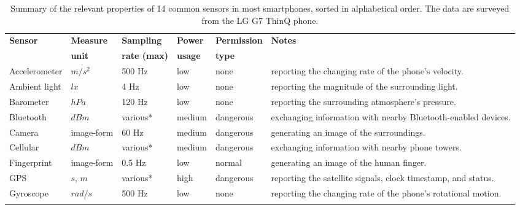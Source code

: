 \documentclass[graybox]{svmult}
\begin{document}
\begin{table}[!ht]
	\caption{Summary of the relevant properties of 14 common sensors in most smartphones, sorted in alphabetical order. The data are surveyed from the LG G7 ThinQ phone.}
	\centering
	\begin{tabular}{p{2cm}p{1.3cm}p{1.5cm}p{1.3cm}p{1.6cm}p{6cm}}%
		\toprule
		\textbf{Sensor} & \textbf{Measure}	& \textbf{Sampling} & \textbf{Power} & \textbf{Permission} & \textbf{Notes}\\
		& \textbf{unit}	& \textbf{rate (max)} & \textbf{usage} & \textbf{type} & \\
		\midrule
		Accelerometer & $m/s^2$ & 500 Hz & low & none & reporting the changing rate of the phone's velocity. \\ \addlinespace[0.2cm]
		
		Ambient light & $lx$ & 4 Hz & low & none & reporting the magnitude of the surrounding light. \\ \addlinespace[0.2cm]

		Barometer & $hPa$ & 120 Hz & low & none & reporting the surrounding atmosphere's pressure. \\ \addlinespace[0.2cm]	
		
		Bluetooth & $dBm$ & various* & medium & dangerous & exchanging information with nearby Bluetooth-enabled devices. \\ \addlinespace[0.2cm]
		
		Camera & image-form & 60 Hz & medium & dangerous & generating an image of the surroundings. \\ \addlinespace[0.2cm]
		
		Cellular & $dBm$ & various* & medium & dangerous & exchanging information with nearby phone towers. \\ \addlinespace[0.2cm]
		
		Fingerprint & image-form & 0.5 Hz & low & normal & generating an image of the human finger. \\ \addlinespace[0.2cm]
		
		GPS	& $s$, $m$ & various* & high & dangerous & reporting the satellite signals, clock timestamp, and status.  \\ \addlinespace[0.2cm]
		
		Gyroscope & $rad/s$ & 500 Hz & low & none & reporting the changing rate of the phone's rotational motion. \\ \addlinespace[0.2cm]
		

\end{tabular}
\end{table}
\end{document}
